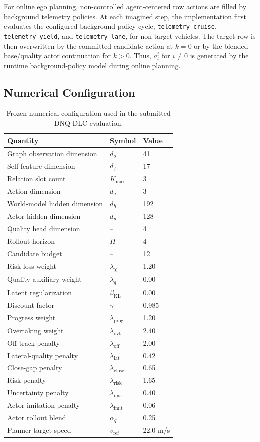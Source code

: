\documentclass[journal]{IEEEtran}
\begin{document}
For online ego planning, non-controlled agent-centered row actions are
filled by background telemetry policies. At each imagined step, the
implementation first evaluates the configured background policy cycle,
\texttt{telemetry\_cruise}, \texttt{telemetry\_yield}, and
\texttt{telemetry\_lane}, for non-target vehicles. The target row is
then overwritten by the committed candidate action at $k=0$ or by the
blended base/quality actor continuation for $k>0$. Thus, $a_t^i$ for
$i\ne0$ is generated by the runtime background-policy model during
online planning.

\subsection{Numerical Configuration}
\label{supp:config}

\begin{table}[t]
\centering
\caption{Frozen numerical configuration used in the submitted DNQ-DLC evaluation.}
\label{tab:supp_config}
\begin{tabular}{lll}
\hline
Quantity & Symbol & Value \\
\hline
Graph observation dimension & $d_o$ & 41 \\
Self feature dimension & $d_\phi$ & 17 \\
Relation slot count & $K_{\max}$ & 3 \\
Action dimension & $d_a$ & 3 \\
World-model hidden dimension & $d_h$ & 192 \\
Actor hidden dimension & $d_p$ & 128 \\
Quality head dimension & -- & 4 \\
Rollout horizon & $H$ & 4 \\
Candidate budget & -- & 12 \\
Risk-loss weight & $\lambda_\chi$ & 1.20 \\
Quality auxiliary weight & $\lambda_q$ & 0.00 \\
Latent regularization & $\beta_{\mathrm{KL}}$ & 0.00 \\
Discount factor & $\gamma$ & 0.985 \\
Progress weight & $\lambda_{\mathrm{prog}}$ & 1.20 \\
Overtaking weight & $\lambda_{\mathrm{ovt}}$ & 2.40 \\
Off-track penalty & $\lambda_{\mathrm{off}}$ & 2.00 \\
Lateral-quality penalty & $\lambda_{\mathrm{lat}}$ & 0.42 \\
Close-gap penalty & $\lambda_{\mathrm{close}}$ & 0.65 \\
Risk penalty & $\lambda_{\mathrm{risk}}$ & 1.65 \\
Uncertainty penalty & $\lambda_{\mathrm{unc}}$ & 0.40 \\
Actor imitation penalty & $\lambda_{\mathrm{imit}}$ & 0.06 \\
Actor rollout blend & $\alpha_q$ & 0.25 \\
Planner target speed & $v_{\mathrm{ref}}$ & 22.0 m/s \\
\hline
\end{tabular}
\end{table}
\end{document}
